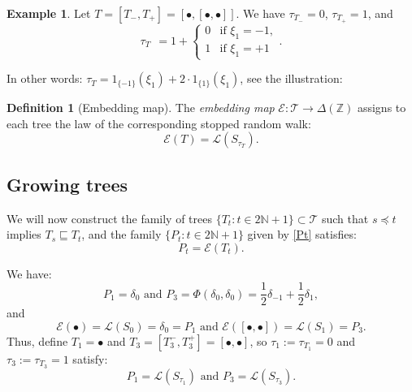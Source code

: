 \documentclass[10pt]{amsart}
\theoremstyle{definition}
\newtheorem{definition}[theorem]{Definition}
\newtheorem{example}[theorem]{Example}
\numberwithin{equation}{section}
\newcommand{\dd}{\delta}
\newcommand{\N}{\mathbb{N}}
\newcommand{\Z}{\mathbb{Z}}
\newcommand{\E}{\mathcal{E}}
\newcommand{\TT}{\mathcal{T}}
\newcommand{\LL}{\mathcal{L}}
\begin{document}
\begin{example}\label{Tree3}
Let $T = [T_-, T_+] = [\bullet, [\bullet, \bullet]]$. We have
$\tau_{T_-} = 0$, $\tau_{T_+} = 1$, and
$$\tau_T \ \ = 1 +
\begin{cases}
0 & \text{if } \xi_1 = -1,\\[2pt]
1 & \text{if } \xi_1 = +1
\end{cases}. $$
\end{example}
In other words: $\tau_T=1_{\{-1\}}(\xi_1)+2\cdot 1_{\{1\}}(\xi_1)$, see the illustration: %
\begin{center}
\end{center}



\begin{definition}[Embedding map]\label{def:embedding}
The \emph{embedding map} $\mathcal{E} \colon \TT \to \Delta(\Z)$ assigns to each tree
 the law of the corresponding stopped random walk:
\[
  \mathcal{E}(T) = \mathcal{L}(S_{\tau_T}).
\]
\end{definition}
\subsection{Growing trees} We will now construct the family of trees $\{T_t\colon t\in 2\N+1\}\subset \TT$ such that $s\preceq t$ implies 
$T_s\sqsubseteq T_t$, and the family  $\{P_t\colon t\in 2\N+1\}$ given by \eqref{Pt} satisfies:
$$P_t=\E(T_t).$$

We have:
$$P_1=\dd_0\mbox{ and }P_3=\Phi(\dd_0, \dd_0)=\frac{1}{2}\dd_{-1} + \frac{1}{2}\dd_{1},$$
and
$$\mathcal{E}(\bullet)=\LL(S_0)= \delta_0=P_1\mbox{ and }\mathcal{E}([\bullet,\bullet])=\LL(S_1)=P_3.$$
Thus, define $T_1 = \bullet$ and $T_3 =[T_3^-,T_3^+]=[\bullet,\bullet]$, so  $\tau_1:=\tau_{T_1}=0$ and $\tau_3:=\tau_{T_3}=1$ satisfy:
$$P_1=\mathcal{L}(S_{\tau_1})\mbox{ and }P_3=\mathcal{L}(S_{\tau_3}).$$
\end{document}
